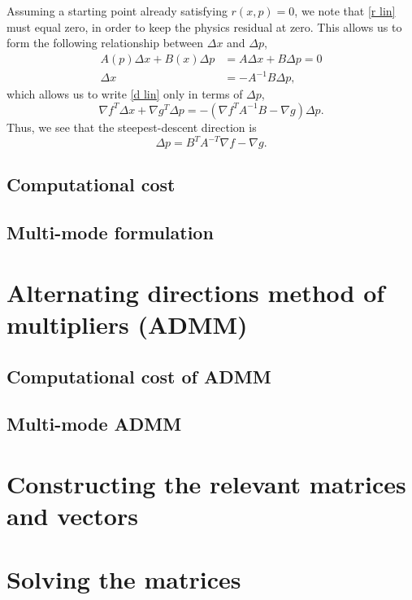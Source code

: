 \documentclass{article}
\begin{document}
Assuming a starting point already satisfying $r(x,p) = 0$,
    we note that \eqref{r lin} must equal zero,
    in order to keep the physics residual at zero.
This allows us to form the following relationship between
    $\Delta x$ and $\Delta p$,
    \begin{subequations}\begin{align}
        A(p) \Delta x + B(x) \Delta p &= A \Delta x + B \Delta p = 0 \\
        \Delta x &= - A^{-1} B \Delta p,
    \end{align}\end{subequations}
    which allows us to write \eqref{d lin} only in terms of $\Delta p$,
    \begin{equation}
    \nabla f^T \Delta x + \nabla g^T \Delta p =
        - (\nabla f^T A^{-1} B - \nabla g) \Delta p.
    \end{equation}
Thus, we see that the steepest-descent direction is
    \begin{equation}
    \Delta p = B^T A^{-T} \nabla f - \nabla g.
    \end{equation}
\subsection{Computational cost}
\subsection{Multi-mode formulation}
\section{Alternating directions method of multipliers (ADMM)}
\subsection{Computational cost of ADMM}
\subsection{Multi-mode ADMM}
\begin{appendix}
\section{Constructing the relevant matrices and vectors}
\section{Solving the matrices}
\end{appendix}
\end{document}
